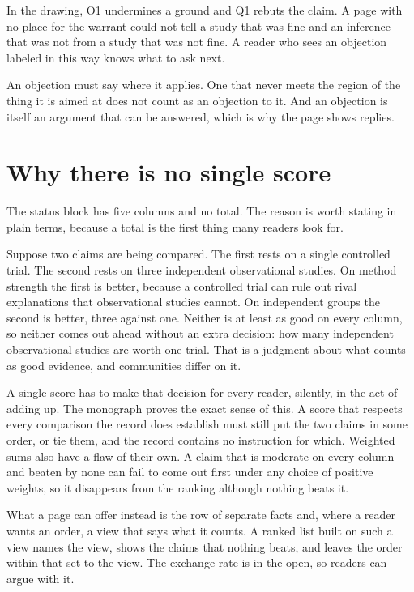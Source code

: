 \documentclass[11pt]{article}
\begin{document}
In the drawing, O1 undermines a ground and Q1 rebuts the claim. A page with no place for the warrant could not tell a study that was fine and an inference that was not from a study that was not fine. A reader who sees an objection labeled in this way knows what to ask next.

An objection must say where it applies. One that never meets the region of the thing it is aimed at does not count as an objection to it. And an objection is itself an argument that can be answered, which is why the page shows replies.

\section{Why there is no single score}\label{sec:noscore}

The status block has five columns and no total. The reason is worth stating in plain terms, because a total is the first thing many readers look for.

Suppose two claims are being compared. The first rests on a single controlled trial. The second rests on three independent observational studies. On method strength the first is better, because a controlled trial can rule out rival explanations that observational studies cannot. On independent groups the second is better, three against one. Neither is at least as good on every column, so neither comes out ahead without an extra decision: how many independent observational studies are worth one trial. That is a judgment about what counts as good evidence, and communities differ on it.

A single score has to make that decision for every reader, silently, in the act of adding up. The monograph proves the exact sense of this. A score that respects every comparison the record does establish must still put the two claims in some order, or tie them, and the record contains no instruction for which. Weighted sums also have a flaw of their own. A claim that is moderate on every column and beaten by none can fail to come out first under any choice of positive weights, so it disappears from the ranking although nothing beats it.

What a page can offer instead is the row of separate facts and, where a reader wants an order, a view that says what it counts. A ranked list built on such a view names the view, shows the claims that nothing beats, and leaves the order within that set to the view. The exchange rate is in the open, so readers can argue with it.
\end{document}
